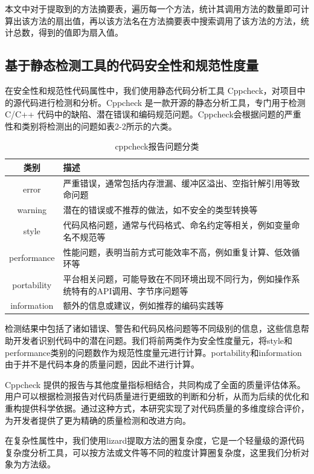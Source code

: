 本文中对于提取到的方法摘要表，遍历每一个方法，统计其调用方法的数量即可计算出该方法的扇出值，再以该方法名在方法摘要表中搜索调用了该方法的方法，统计总数，得到的值即为扇入值。

\subsection{基于静态检测工具的代码安全性和规范性度量}

在安全性和规范性代码属性中，我们使用静态代码分析工具 Cppcheck，对项目中的源代码进行检测和分析。Cppcheck 是一款开源的静态分析工具，专门用于检测 C/C++ 代码中的缺陷、潜在错误和编码规范问题。Cppcheck会根据问题的严重性和类别将检测出的问题如表2-2所示的六类。

\begin{table}[htbp]
\caption{cppcheck报告问题分类}
\vspace{0.5em}\centering\wuhao
\begin{tabular}{cp{12cm}}
\toprule
类别 & 描述 \\
\midrule
error & 严重错误，通常包括内存泄漏、缓冲区溢出、空指针解引用等致命问题 \\
warning & 潜在的错误或不推荐的做法，如不安全的类型转换等 \\
style & 代码风格问题，通常与代码格式、命名约定等相关，例如变量命名不规范等 \\
performance & 性能问题，表明当前方式可能效率不高，例如重复计算、低效循环等 \\
portability & 平台相关问题，可能导致在不同环境出现不同行为，例如操作系统特有的API调用、字节序问题等 \\
information & 额外的信息或建议，例如推荐的编码实践等 \\
\bottomrule
\end{tabular}
\end{table}


检测结果中包括了诸如错误、警告和代码风格问题等不同级别的信息，这些信息帮助开发者识别代码中的潜在问题。我们将前两类作为安全性度量元，将style和performance类别的问题数作为规范性度量元进行计算。portability和information由于并不是代码本身的质量问题，因此不进行计算。

Cppcheck 提供的报告与其他度量指标相结合，共同构成了全面的质量评估体系。用户可以根据检测报告对代码质量进行更细致的判断和分析，从而为后续的优化和重构提供科学依据。通过这种方式，本研究实现了对代码质量的多维度综合评价，为开发者提供了更为精确的质量检测和改进方向。

在复杂性属性中，我们使用lizard提取方法的圈复杂度，它是一个轻量级的源代码复杂度分析工具，可以按方法或文件等不同的粒度计算圈复杂度，这里我们分析对象为方法级。

